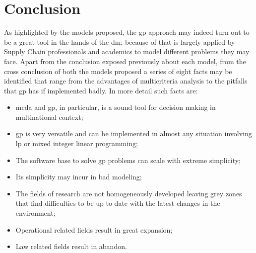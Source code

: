 \clearpage{\pagestyle{empty}\cleardoublepage}
\chapter*{Conclusion}

\begin{doublespace}
	As highlighted by the models proposed, the \gls{gp} approach may indeed turn out to be a great tool in the hands of the \gls{dm}; because of that is largely applied by Supply Chain professionals and academics to model different problems they may face. Apart from the conclusion exposed previously about each model, from the cross conclusion of both the models proposed a series of eight facts may be identified that range from the advantages of multicriteria analysis to the pitfalls that \gls{gp} has if implemented badly. In more detail such facts are:

\begin{itemize}
	\item \gls{mcda} and \gls{gp}, in particular, is a sound tool for decision making in multinational context;
	\item \gls{gp} is very versatile and can be implemented in almost any situation involving \gls{lp} or mixed integer linear programming;
	\item The software base to solve \gls{gp} problems can scale with extreme simplicity;
    \item Its simplicity may incur in bad modeling;
    \item The fields of research are not homogeneously developed leaving grey zones that find difficulties to be up to date with the latest changes in the environment;
    \item Operational related fields result in great expansion;
    \item Law related fields result in abandon.
\end{itemize}


\end{doublespace}
